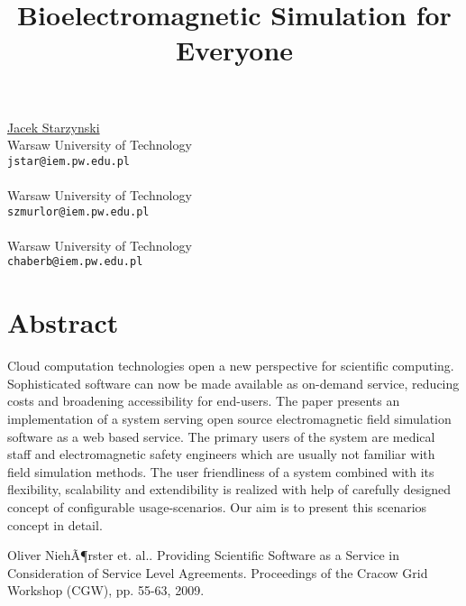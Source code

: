 \title{Bioelectromagnetic Simulation for Everyone}
 \author{} \institute{}
\maketitle
\begin{center}
{\large \underline{Jacek Starzynski}}\\
Warsaw University of Technology\\
{\tt jstar@iem.pw.edu.pl}
\\ \vspace{4mm}{\large Robert Szmuro}\\
Warsaw University of Technology\\
{\tt szmurlor@iem.pw.edu.pl}
\\ \vspace{4mm}{\large Bartosz Chaber}\\
Warsaw University of Technology\\
{\tt chaberb@iem.pw.edu.pl}

\end{center}

\section*{Abstract}

Cloud computation technologies open a new perspective for scientific computing. Sophisticated software
can now be made available as on-demand service, reducing costs and broadening accessibility for end-users.
The paper presents an implementation of a system serving open source electromagnetic field simulation software
as a web based service.
The primary users of the system are medical staff and electromagnetic
safety engineers which are usually not familiar with field simulation methods. The user friendliness of a system
combined with its flexibility, scalability and extendibility is realized with help of carefully designed
concept of configurable usage-scenarios. Our aim is to present this scenarios concept in detail.



\begin{thebibliography}{10}

{\sc Oliver NiehÃ¶rster et. al.}. {Providing Scientific Software as a Service in Consideration of Service Level Agreements}. Proceedings of the Cracow Grid Workshop (CGW), pp. 55-63, 2009.

\end{thebibliography}
